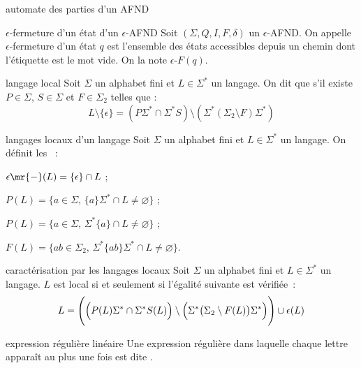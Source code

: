 \begin{adjustwidth}{-3cm}{-3cm}
\begin{definition}{2.9}{automate des parties d'un AFND}
\end{definition}

\begin{definition}{2.10}{$\epsilon$-fermeture d'un état d'un $\epsilon$-AFND}
    Soit $(\Sigma, Q, I, F, \delta)$ un $\epsilon$-AFND. On appelle $\epsilon$-fermeture d'un état $q$ est l'ensemble des états accessibles depuis un chemin dont l'étiquette est le mot vide. On la note $\epsilon$-$F(q)$.
\end{definition}

\begin{definition}{2.11}{langage local}
    Soit $\Sigma$ un alphabet fini et $L \in \Sigma^*$ un langage. On dit que  s'il existe $P \in \Sigma$, $S \in \Sigma$ et $F \in \Sigma_2$ telles que :
    $$L\setminus \{\epsilon\} = (P\Sigma^* \cap \Sigma^*S) \setminus (\Sigma^*(\Sigma_2 \setminus F)\Sigma^*)$$
\end{definition} 

\begin{definition}{2.11}{langages locaux d'un langage}
    Soit $\Sigma$ un alphabet fini et $L \in \Sigma^*$ un langage. On définit les ~:
    \begin{enumeratebf}
        \item $\epsilon \mr{-} (L) = \{\epsilon\} \cap L$ ;
        \item $P(L) = \{a \in \Sigma,\, \{a\}\Sigma^* \cap L \neq \varnothing\}$ ;
        \item $P(L) = \{a \in \Sigma,\, \Sigma^*\{a\} \cap L \neq \varnothing\}$ ;
        \item $F(L) = \{ab \in \Sigma_2,\, \Sigma^*\{ab\}\Sigma^* \cap L \neq \varnothing\}$.
    \end{enumeratebf}
\end{definition} 

\begin{proposition}{2.12}{caractérisation par les langages locaux}
    Soit $\Sigma$ un alphabet fini et $L \in \Sigma^*$ un langage. $L$ est local si et seulement si l'égalité suivante est vérifiée~:
    $$L = \Biggl( \Bigl( P(L) \Sigma^* \cap \Sigma^* S(L)\Bigr) \setminus \Bigl( \Sigma^* \bigl( \Sigma_2 \setminus F(L) \bigr) \Sigma^* \Bigr) \Biggr) \cup \epsilon (L) $$
\end{proposition}

\begin{definition}{2.13}{expression régulière linéaire}
    Une expression régulière dans laquelle chaque lettre apparaît au plus une fois est dite .
\end{definition}


\end{adjustwidth}
